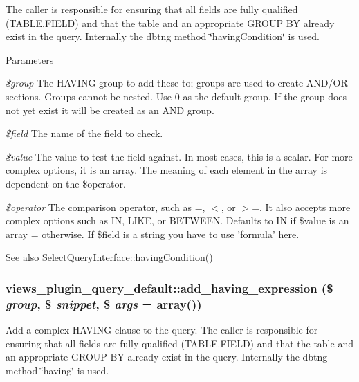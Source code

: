 The caller is responsible for ensuring that all fields are fully qualified (TABLE.FIELD) and that the table and an appropriate GROUP BY already exist in the query. Internally the dbtng method \char`\"{}havingCondition\char`\"{} is used.


\begin{DoxyParams}{Parameters}
\item[{\em \$group}]The HAVING group to add these to; groups are used to create AND/OR sections. Groups cannot be nested. Use 0 as the default group. If the group does not yet exist it will be created as an AND group. \item[{\em \$field}]The name of the field to check. \item[{\em \$value}]The value to test the field against. In most cases, this is a scalar. For more complex options, it is an array. The meaning of each element in the array is dependent on the \$operator. \item[{\em \$operator}]The comparison operator, such as =, $<$, or $>$=. It also accepts more complex options such as IN, LIKE, or BETWEEN. Defaults to IN if \$value is an array = otherwise. If \$field is a string you have to use 'formula' here.\end{DoxyParams}
\begin{DoxySeeAlso}{See also}
\hyperlink{interfaceSelectQueryInterface_a5b33d0a9d60cb31a705d590ae1cf8bef}{SelectQueryInterface::havingCondition()} 
\end{DoxySeeAlso}
\hypertarget{classviews__plugin__query__default_a04031a4ad7be93ad612c37e09596e814}{
\subsubsection[{add\_\-having\_\-expression}]{\setlength{\rightskip}{0pt plus 5cm}views\_\-plugin\_\-query\_\-default::add\_\-having\_\-expression (\$ {\em group}, \/  \$ {\em snippet}, \/  \$ {\em args} = {\ttfamily array()})}}
\label{classviews__plugin__query__default_a04031a4ad7be93ad612c37e09596e814}
Add a complex HAVING clause to the query. The caller is responsible for ensuring that all fields are fully qualified (TABLE.FIELD) and that the table and an appropriate GROUP BY already exist in the query. Internally the dbtng method \char`\"{}having\char`\"{} is used.


